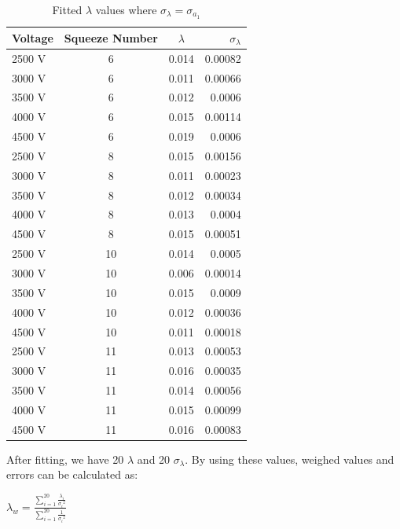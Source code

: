 \documentclass[aps,twocolumn,secnumarabic,nobalancelastpage,amsmath,amssymb,
nofootinbib]{revtex4}
\begin{document}
\begin{center}
\begin{table}[htbp]
\begin{tabular}{|l|c|c|r|}
\hline
{\small Voltage}&{\small Squeeze Number} & { \small $\lambda$} & {\small  ${\sigma}_{\lambda} $ } \\
\hline
2500 V&6& 0.014 & 0.00082 \\
3000 V&6& 0.011 & 0.00066  \\
3500 V&6& 0.012 & 0.0006  \\
4000 V&6& 0.015 & 0.00114  \\
4500 V&6& 0.019 & 0.0006  \\

2500 V&8& 0.015 & 0.00156 \\
3000 V&8& 0.011 & 0.00023  \\
3500 V&8& 0.012 & 0.00034  \\
4000 V&8& 0.013 & 0.0004  \\
4500 V&8& 0.015 & 0.00051  \\

2500 V&10& 0.014 & 0.0005 \\
3000 V&10& 0.006 & 0.00014  \\
3500 V&10& 0.015 & 0.0009  \\
4000 V&10& 0.012 & 0.00036  \\
4500 V&10& 0.011 & 0.00018  \\

2500 V&11& 0.013 & 0.00053 \\
3000 V&11& 0.016 & 0.00035  \\
3500 V&11& 0.014 & 0.00056  \\
4000 V&11& 0.015 & 0.00099  \\
4500 V&11& 0.016 & 0.00083  \\





\hline
\end{tabular}
\caption{\label{tab:linfitresults} Fitted $\lambda$ values where ${\sigma}_{\lambda}={\sigma}_{{a}_{1}}$ }
\end{table}
\end{center}




After fitting, we have 20 $\lambda$ and 20 $\sigma_{\lambda}$. By using these values, weighed values and errors can be calculated as:

\begin{center}
${ \lambda  }_{ w }=\frac { \sum _{ i=1 }^{ 20 }{ \frac { { \lambda  }_{ i } }{ { { \sigma  }_{ i } }^{ 2 } }  }  }{ \sum _{ i=1 }^{ 20 }{ \frac { 1 }{ { { \sigma  }_{ i } }^{ 2 } }  }  } $
\end{center}
\end{document}
